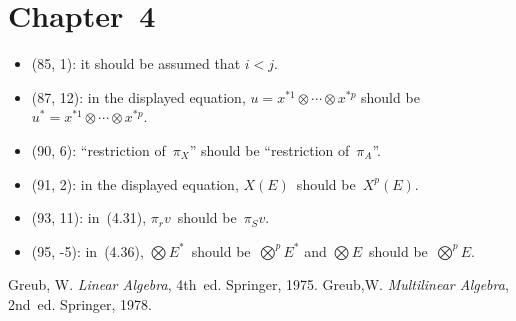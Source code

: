 \documentclass[letterpaper,12pt]{article}
\newcommand{\tprod}{\otimes}
\newcommand{\bigtprod}{\bigotimes}
\begin{document}
\section*{Chapter~4}
\begin{itemize}
\item (85, 1): it should be assumed that \(i<j\).
\item (87, 12): in the displayed equation, \(u=x^{*1}\tprod\cdots\tprod x^{*p}\) should be \(u^*=x^{*1}\tprod\cdots\tprod x^{*p}\).
\item (90, 6): ``restriction of~\(\pi_X\)'' should be ``restriction of~\(\pi_A\)''.
\item (91, 2): in the displayed equation, \(X(E)\)~should be~\(X^p(E)\).
\item (93, 11): in~(4.31), \(\pi_r v\)~should be~\(\pi_S v\).
\item (95, -5): in~(4.36), \(\bigtprod E^*\)~should be~\(\bigtprod^p E^*\) and \(\bigtprod E\)~should be~\(\bigtprod^p E\).
\end{itemize}

\begin{thebibliography}{0}
 Greub, W. \textit{Linear Algebra}, 4th~ed. Springer, 1975.
 Greub,W. \textit{Multilinear Algebra}, 2nd~ed. Springer, 1978.
\end{thebibliography}
\end{document}
